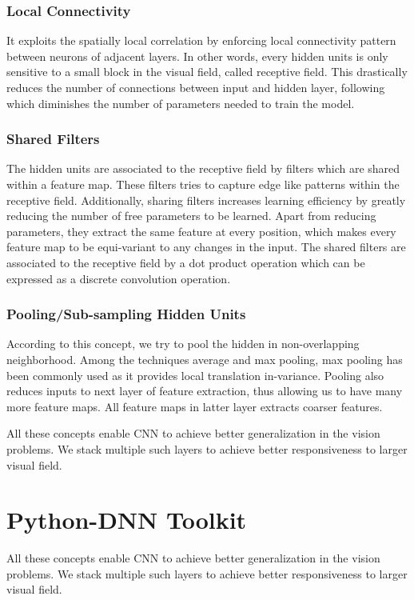 \documentclass[MTech]{iitmdiss}
\begin{document}
\subsubsection{Local Connectivity}
It exploits the spatially local correlation by enforcing local connectivity pattern between neurons of adjacent layers. In other words, every hidden units is only sensitive to a small block in  the visual field, called receptive field. This drastically reduces the number of connections between input and hidden layer, following which diminishes the number of parameters needed to train the model.
\subsubsection{Shared Filters}
The hidden units are associated to the receptive field by filters which are shared within a feature map. These filters tries to capture edge like patterns within the receptive field. Additionally, sharing filters increases learning efficiency by greatly reducing the number of free parameters to be learned. Apart from reducing parameters, they extract the same feature at every position, which makes every feature map to be equi-variant to any changes in the input. The shared filters are associated to the receptive field by a dot product operation which can be expressed as a discrete convolution operation.
\subsubsection{Pooling/Sub-sampling Hidden Units}
According to this concept, we try to pool the hidden in non-overlapping neighborhood. Among the techniques average and max pooling, max pooling has been commonly used as it provides local translation in-variance. Pooling also reduces inputs to next layer of feature extraction, thus allowing us to have many more feature maps. All feature maps in latter layer extracts coarser features.\par
All these concepts enable CNN to achieve better generalization in the vision problems. We stack multiple such layers to achieve better responsiveness to larger visual field. \section{Python-DNN Toolkit}
All these concepts enable CNN to achieve better generalization in the vision problems. We stack multiple such layers to achieve better responsiveness to larger visual field.
\end{document}
